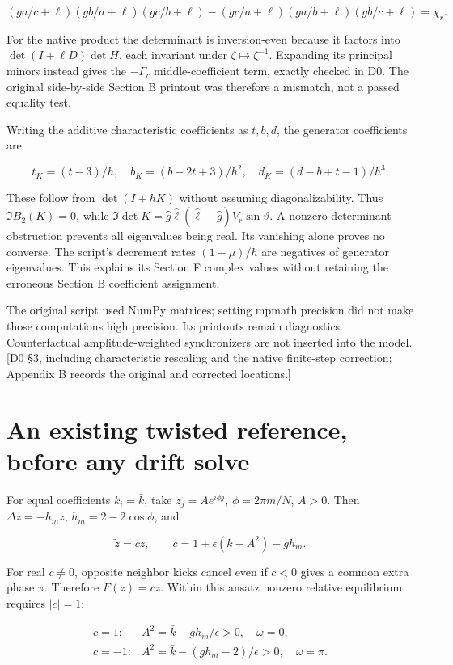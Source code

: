 \documentclass[11pt,a4paper]{article}
\begin{document}
\[
(ga/c+\ell)(gb/a+\ell)(gc/b+\ell)
-(gc/a+\ell)(ga/b+\ell)(gb/c+\ell)=\chi_r.
\]

For the native product the determinant is inversion-even because it factors into \(\det(I+\ell D)\det H\), each invariant under \(\zeta\mapsto\zeta^{-1}\). Expanding its principal minors instead gives the \(-\Gamma_r\) middle-coefficient term, exactly checked in D0. The original side-by-side Section B printout was therefore a mismatch, not a passed equality test.

Writing the additive characteristic coefficients as \(t,b,d\), the generator coefficients are

\[
t_K=(t-3)/h,\quad b_K=(b-2t+3)/h^2,\quad
d_K=(d-b+t-1)/h^3.
\tag{D18}\label{eq:D18}
\]

These follow from \(\det(I+hK)\) without assuming diagonalizability. Thus \(\Im B_2(K)=0\), while
\(\Im\det K=\widehat g\widehat\ell(\widehat\ell-\widehat g)V_r\sin\vartheta\).
A nonzero determinant obstruction prevents all eigenvalues being real. Its vanishing alone proves no converse. The script's decrement rates \((1-\mu)/h\) are negatives of generator eigenvalues. This explains its Section F complex values without retaining the erroneous Section B coefficient assignment.

The original script used NumPy matrices; setting mpmath precision did not make those computations high precision. Its printouts remain diagnostics. Counterfactual amplitude-weighted synchronizers are not inserted into the model. [D0 \S{}3, including characteristic rescaling and the native finite-step correction; Appendix B records the original and corrected locations.]

\section{An existing twisted reference, before any drift solve}

For equal coefficients \(k_i=\bar k\), take \(z_j=Ae^{i\phi j}\), \(\phi=2\pi m/N\), \(A>0\). Then \(\Delta z=-h_m z\), \(h_m=2-2\cos\phi\), and

\[
\widetilde z=c z,\qquad c=1+\epsilon(\bar k-A^2)-g h_m.
\]

For real \(c\ne0\), opposite neighbor kicks cancel even if \(c<0\) gives a common extra phase \(\pi\). Therefore \(F(z)=cz\). Within this ansatz nonzero relative equilibrium requires \(|c|=1\):

\[
\begin{array}{ll}
c=1:&A^2=\bar k-gh_m/\epsilon>0,\quad \omega=0,\\
c=-1:&A^2=\bar k-(gh_m-2)/\epsilon>0,\quad \omega=\pi.
\end{array}\tag{D19}\label{eq:D19}
\]
\end{document}

